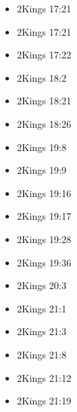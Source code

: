 \documentclass[14pt]{article}
\begin{document}
\begin{multicols}{2}
\begin{itemize}
													\item 2Kings 17:21
													
													\item 2Kings 17:21
													
													\item 2Kings 17:22
													
													\item 2Kings 18:2
													
													\item 2Kings 18:21
													
													\item 2Kings 18:26
													
													\item 2Kings 19:8
													
													\item 2Kings 19:9
													
													\item 2Kings 19:16
													
													\item 2Kings 19:17
													
													\item 2Kings 19:28
													
													\item 2Kings 19:36
													
													\item 2Kings 20:3
													
													\item 2Kings 21:1
													
													\item 2Kings 21:3
													
													\item 2Kings 21:8
													
													\item 2Kings 21:12
													
													\item 2Kings 21:19
													

\end{itemize}
\end{multicols}
\end{document}
